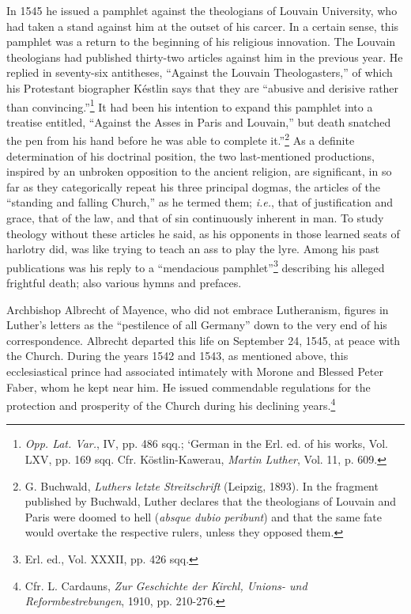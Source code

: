 In 1545 he issued a pamphlet against the theologians of Louvain
University, who had taken a stand against him at the outset of his
carcer. In a certain sense, this pamphlet was a return to the beginning
of his religious innovation. The Louvain theologians had published thirty-two
articles against him in the previous year. He replied in seventy-six antitheses,
“Against the Louvain Theologasters,”
of which his Protestant biographer Késtlin says that they are “abusive
and derisive rather than convincing.”\footnote
{\textit{Opp. Lat. Var.}, IV, pp. 486 sqq.; ‘German in the Erl. ed. of his works, Vol. LXV, pp.
169 sqq. Cfr. Köstlin-Kawerau, \textit{Martin Luther}, Vol. 11, p. 609.}
It had been his intention to
expand this pamphlet into a treatise entitled, “Against the Asses in
Paris and Louvain,” but death snatched the pen from his hand before
he was able to complete it.”\footnote
{G. Buchwald, \textit{Luthers letzte Streitschrift} (Leipzig, 1893). In the fragment published
by Buchwald, Luther declares that the theologians of Louvain and Paris were doomed to
hell (\textit{absque dubio peribunt}) and that the same fate would overtake the respective rulers,
unless they opposed them.}
As a definite determination of his doctrinal
position, the two last-mentioned productions, inspired by an
unbroken opposition to the ancient religion, are significant, in so far
as they categorically repeat his three principal dogmas, the articles
of the “standing and falling Church,” as he termed them; \textit{i.e.}, that
of justification and grace, that of the law, and that of sin continuously
inherent in man. To study theology without these articles he said,
as his opponents in those learned seats of harlotry did, was like trying
to teach an ass to play the lyre. Among his past publications was
his reply to a “mendacious pamphlet”\footnote{Erl. ed., Vol. XXXII, pp. 426 sqq.}
 describing his alleged frightful
death; also various hymns and prefaces.

Archbishop Albrecht of Mayence, who did not embrace Lutheranism, figures
in Luther’s letters as the “pestilence of all Germany”
down to the very end of his correspondence. Albrecht departed this
life on September 24, 1545, at peace with the Church. During the
years 1542 and 1543, as mentioned above, this ecclesiastical prince
had associated intimately with Morone and Blessed Peter Faber, whom
he kept near him. He issued commendable regulations for the protection
and prosperity of the Church during his declining years.\footnote
{Cfr. L. Cardauns, \textit{Zur Geschichte der Kirchl, Unions- und Reformbestrebungen}, 1910,
pp. 210-276.}

